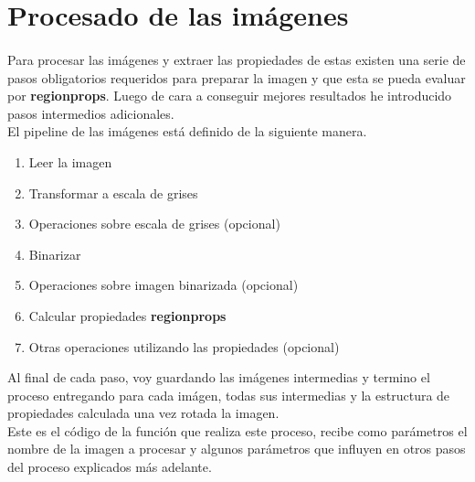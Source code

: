 \documentclass[es,gi]{ifirak}\usepackage[]{graphicx}\usepackage[]{color}
\begin{document}
\pagebreak

\section{Procesado de las imágenes}
\paragraph{}
Para procesar las imágenes y extraer las propiedades de estas existen una serie de pasos obligatorios requeridos para preparar la imagen y que esta se pueda evaluar por \textbf{regionprops}. Luego de cara a conseguir mejores resultados he introducido pasos intermedios adicionales.\\

El pipeline de las imágenes está definido de la siguiente manera.\\

\begin{enumerate}
\item Leer la imagen
\item Transformar a escala de grises
\item Operaciones sobre escala de grises (opcional) 
\item Binarizar
\item Operaciones sobre imagen binarizada (opcional)
\item Calcular propiedades \textbf{regionprops}
\item Otras operaciones utilizando las propiedades (opcional)
\end{enumerate}

Al final de cada paso, voy guardando las imágenes intermedias y termino el proceso entregando para cada imágen, todas sus intermedias y la estructura de propiedades calculada una vez rotada la imagen.\\

Este es el código de la función que realiza este proceso, recibe como parámetros el nombre de la imagen a procesar y algunos parámetros que influyen en otros pasos del proceso explicados más adelante.
\end{document}
